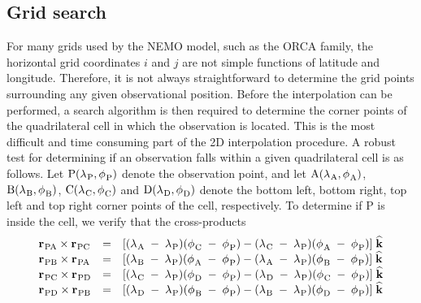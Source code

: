 \documentclass[../main/NEMO_manual]{subfiles}
\begin{document}
\subsection{Grid search}

For many grids used by the NEMO model, such as the ORCA family, the horizontal grid coordinates $i$ and $j$ are not simple functions of latitude and longitude.
Therefore, it is not always straightforward to determine the grid points surrounding any given observational position.
Before the interpolation can be performed, a search algorithm is then required to determine the corner points of 
the quadrilateral cell in which the observation is located.
This is the most difficult and time consuming part of the 2D interpolation procedure. 
A robust test for determining if an observation falls within a given quadrilateral cell is as follows.
Let ${\rm P}({\lambda_{}}_{\rm P} ,{\phi_{}}_{\rm P} )$ denote the observation point,
and let ${\rm A}({\lambda_{}}_{\rm A} ,{\phi_{}}_{\rm A} )$, ${\rm B}({\lambda_{}}_{\rm B} ,{\phi_{}}_{\rm B} )$,
${\rm C}({\lambda_{}}_{\rm C} ,{\phi_{}}_{\rm C} )$ and ${\rm D}({\lambda_{}}_{\rm D} ,{\phi_{}}_{\rm D} )$
denote the bottom left, bottom right, top left and top right corner points of the cell, respectively. 
To determine if P is inside the cell, we verify that the cross-products 
\begin{align*}
  \begin{array}{lllll}
    {{\bf r}_{}}_{\rm PA} \times {{\bf r}_{}}_{\rm PC}
    & = & [({\lambda_{}}_{\rm A}\; -\; {\lambda_{}}_{\rm P} )
          ({\phi_{}}_{\rm C}   \; -\; {\phi_{}}_{\rm P} )
          - ({\lambda_{}}_{\rm C}\; -\; {\lambda_{}}_{\rm P} )
          ({\phi_{}}_{\rm A}   \; -\; {\phi_{}}_{\rm P} )] \; \widehat{\bf k} \\
    {{\bf r}_{}}_{\rm PB} \times {{\bf r}_{}}_{\rm PA}
    & = & [({\lambda_{}}_{\rm B}\; -\; {\lambda_{}}_{\rm P} )
          ({\phi_{}}_{\rm A}   \; -\; {\phi_{}}_{\rm P} )
          - ({\lambda_{}}_{\rm A}\; -\; {\lambda_{}}_{\rm P} )
          ({\phi_{}}_{\rm B}   \; -\; {\phi_{}}_{\rm P} )] \; \widehat{\bf k} \\
    {{\bf r}_{}}_{\rm PC} \times {{\bf r}_{}}_{\rm PD}
    & = & [({\lambda_{}}_{\rm C}\; -\; {\lambda_{}}_{\rm P} )
          ({\phi_{}}_{\rm D}   \; -\; {\phi_{}}_{\rm P} )
          - ({\lambda_{}}_{\rm D}\; -\; {\lambda_{}}_{\rm P} )
          ({\phi_{}}_{\rm C}   \; -\; {\phi_{}}_{\rm P} )] \; \widehat{\bf k} \\
    {{\bf r}_{}}_{\rm PD} \times {{\bf r}_{}}_{\rm PB}
    & = & [({\lambda_{}}_{\rm D}\; -\; {\lambda_{}}_{\rm P} )
          ({\phi_{}}_{\rm B}   \; -\; {\phi_{}}_{\rm P} )
          - ({\lambda_{}}_{\rm B}\; -\; {\lambda_{}}_{\rm P} )
          ({\phi_{}}_{\rm D}  \;  - \; {\phi_{}}_{\rm P} )] \; \widehat{\bf k} \\
  \end{array}
\end{align*}
\end{document}
